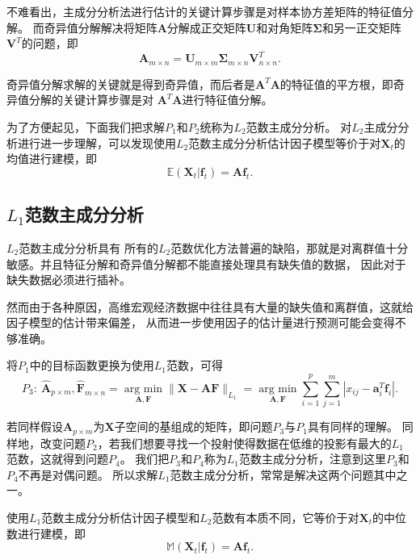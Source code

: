不难看出，主成分分析法进行估计的关键计算步骤是对样本协方差矩阵的特征值分解。
而奇异值分解解决将矩阵$\bm{A}$分解成正交矩阵$\bm{U}$和对角矩阵$\bm{\Sigma}$和另一正交矩阵$\bm{V}^T$的问题，即
$$
    \bm{A}_{m \times n} = \bm{U}_{m \times m}\bm{\Sigma}_{m \times n}\bm{V}_{n \times n}^T.
$$

奇异值分解求解的关键就是得到奇异值，而后者是$\bm{A}^T\bm{A}$的特征值的平方根，即奇异值分解的关键计算步骤是对
$\bm{A}^T\bm{A}$进行特征值分解。

为了方便起见，下面我们把求解$P_1$和$P_2$统称为$L_2$范数主成分分析。
对$L_2$主成分分析进行进一步理解，可以发现使用$L_2$范数主成分分析估计因子模型等价于对$\bm X_t$的均值进行建模，即
\begin{equation*}
    \mathbb E (\bm X_t | \bm f_t) = \bm A \bm f_t.
\end{equation*}

\subsection{$L_1$范数主成分分析}

$L_2$范数主成分分析具有
所有的$L_2$范数优化方法普遍的缺陷，那就是对离群值十分敏感。并且特征分解和奇异值分解都不能直接处理具有缺失值的数据，
因此对于缺失数据必须进行插补。

然而由于各种原因，高维宏观经济数据中往往具有大量的缺失值和离群值，这就给因子模型的估计带来偏差，
从而进一步使用因子的估计量进行预测可能会变得不够准确。

将$P_1$中的目标函数更换为使用$L_1$范数，可得
\begin{equation}\label{p3}
    P_3: \ 
\hat{\bm{A}}_{p\times m}, \hat{\bm{F}}_{m\times n} = \underset{\bm{A},\bm{F}}{\operatorname{arg\ min} } \|\bm X - \bm{A}\bm{F}\|_{L_1}
= \underset{\bm{A}, \bm{F}}{\operatorname{arg\ min}} \sum_{i=1}^p \sum_{j=1}^m |x_{ij} - \bm a_i^T \bm f_i|.
\end{equation}

若同样假设$\bm{A}_{p\times m}$为$\bm{X}$子空间的基组成的矩阵，即问题$P_3$与$P_1$具有同样的理解。
同样地，改变问题$P_2$，若我们想要寻找一个投射使得数据在低维的投影有最大的$L_1$范数，这就得到问题$P_4$。
我们把$P_3$和$P_4$称为$L_1$范数主成分分析，注意到这里$P_3$和$P_4$不再是对偶问题。
所以求解$L_1$范数主成分分析，常常是解决这两个问题其中之一。

使用$L_1$范数主成分分析估计因子模型和$L_2$范数有本质不同，它等价于对$\bm X_t$的中位数进行建模，即
\begin{equation*}
    \mathbb M(\bm X_t | \bm f_t) = \bm A \bm f_t.
\end{equation*}

